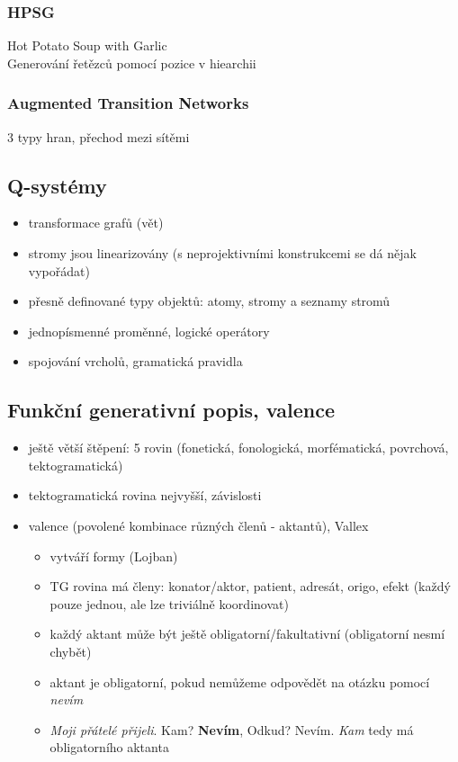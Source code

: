 \documentclass[a4paper]{article}
\begin{document}
\subsubsection*{HPSG}
Hot Potato Soup with Garlic \\
Generování řetězců pomocí pozice v hiearchii

\subsubsection*{Augmented Transition Networks}
3 typy hran, přechod mezi sítěmi

\subsection*{Q-systémy}
\begin{itemize}
\item transformace grafů (vět)
\item stromy jsou linearizovány (s neprojektivními konstrukcemi se dá nějak vypořádat)
\item přesně definované typy objektů: atomy, stromy a seznamy stromů
\item jednopísmenné proměnné, logické operátory
\item spojování vrcholů, gramatická pravidla
\end{itemize}

\subsection*{Funkční generativní popis, valence}
\begin{itemize}
\item ještě větší štěpení: 5 rovin (fonetická, fonologická, morfématická, povrchová, tektogramatická)
\item tektogramatická rovina nejvyšší, závislosti
\item valence (povolené kombinace různých členů - aktantů), Vallex \begin{itemize}
	\item vytváří formy (Lojban)
	\item TG rovina má členy: konator/aktor, patient, adresát, origo, efekt (každý pouze jednou, ale lze triviálně koordinovat)
	\item každý aktant může být ještě obligatorní/fakultativní (obligatorní nesmí chybět)
	\item aktant je obligatorní, pokud nemůžeme odpovědět na otázku pomocí \textit{nevím}
	\item \textit{Moji přátelé přijeli}. Kam? \textbf{Nevím}, Odkud? Nevím. \textit{Kam} tedy má obligatorního aktanta
\end{itemize}
\end{itemize}
\end{document}

